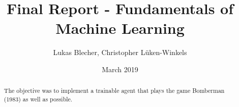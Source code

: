 \documentclass[12pt]{article}
\title{Final Report - Fundamentals of Machine Learning}
\author{Lukas Blecher, Christopher L\"uken-Winkels}
\date{March 2019}
\begin{document}
\maketitle
\begin{abstract}
    The objective was to implement a trainable agent that plays the game Bomberman (1983)\cite{wiki:001} as well as possible.
\end{abstract}




\end{document}
